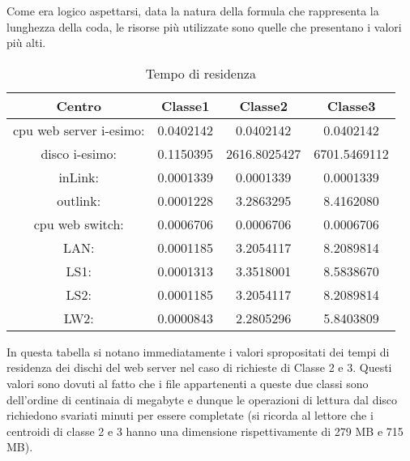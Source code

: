 Come era logico aspettarsi, data la natura della formula che rappresenta la lunghezza della coda, le risorse più utilizzate sono quelle che presentano i valori più alti.
\begin{table}[H]
\begin{center}
\begin{tabular}{||c|c|c|c||}
\hline
Centro &Classe1 &Classe2 &Classe3\\
\hline
\hline
 cpu web server i-esimo: 	&0.0402142	&0.0402142	&0.0402142	\\\hline
 disco i-esimo: 	&0.1150395	&2616.8025427	&6701.5469112	\\\hline
 inLink: 	&0.0001339	&0.0001339	&0.0001339	\\\hline
 outlink: 	&0.0001228	&3.2863295	&8.4162080	\\\hline
 cpu web switch: 	&0.0006706	&0.0006706	&0.0006706	\\\hline
 LAN: 	&0.0001185	&3.2054117	&8.2089814	\\\hline
 LS1: 	&0.0001313	&3.3518001	&8.5838670	\\\hline
 LS2: 	&0.0001185	&3.2054117	&8.2089814	\\\hline
 LW2: 	&0.0000843	&2.2805296	&5.8403809	\\\hline
\end{tabular}
\end{center}
\caption{Tempo di residenza}
\label{tempodiresidenza}
\end{table}
In questa tabella si notano immediatamente i valori spropositati dei tempi di residenza dei dischi del web server nel caso di richieste di Classe 2 e 3. Questi valori sono dovuti al fatto che i file appartenenti a queste due classi sono dell'ordine di centinaia di megabyte e dunque le operazioni di lettura dal disco richiedono svariati minuti per essere completate (si ricorda al lettore che i centroidi di classe 2 e 3 hanno una dimensione rispettivamente di 279 MB e 715 MB).

